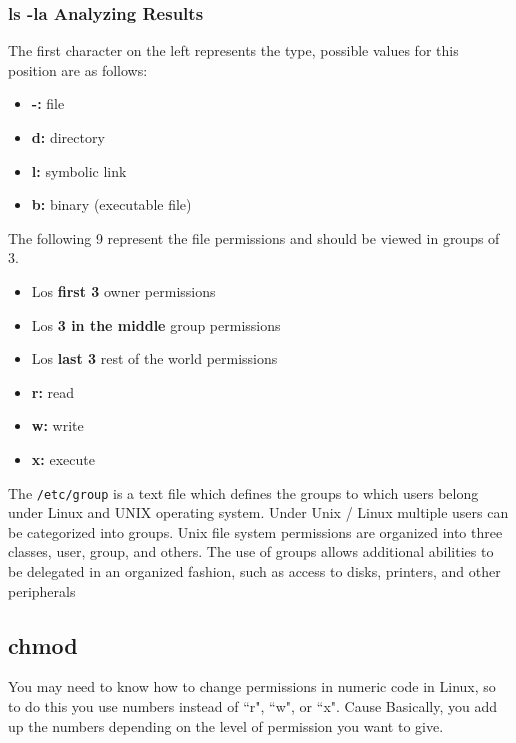 \documentclass{article}
\newenvironment{blocktemplateII}[1]{%
    \tcolorbox[beamer,%
    noparskip,breakable,
    colframe=Green,%
    colbacklower=LimeGreen!75!LightGreen,%
    title=#1]}%
    {\endtcolorbox}
\begin{document}
\subsubsection{ls -la Analyzing Results}
The first character on the left represents the type, possible values for this position are as follows:

\begin{itemize}
    \item \textbf{-:} file
    \item \textbf{d:} directory
    \item \textbf{l:} symbolic link
    \item \textbf{b:} binary (executable file)
\end{itemize}

The following 9 represent the file permissions and should be viewed in groups of 3.

\begin{itemize}
    \item Los \textbf{first 3} owner permissions 
    \item Los \textbf{3 in the middle} group permissions
    \item Los \textbf{last 3} rest of the world permissions
\end{itemize}
\begin{itemize}
    \item \textbf{r:} read
    \item \textbf{w:} write 
    \item \textbf{x:} execute
\end{itemize}

\begin{blocktemplateII}{Note}
The \verb+/etc/group+ is a text file which defines the groups to which users belong under Linux and UNIX operating system. Under Unix / Linux multiple users can be categorized into groups. Unix file system permissions are organized into three classes, user, group, and others. The use of groups allows additional abilities to be delegated in an organized fashion, such as access to disks, printers, and other peripherals    
\end{blocktemplateII}

\subsection{chmod}

You may need to know how to change permissions in numeric code in Linux, so to do this you use numbers instead of “r", “w", or “x". Cause Basically, you add up the numbers depending on the level of permission you want to give.
\end{document}
